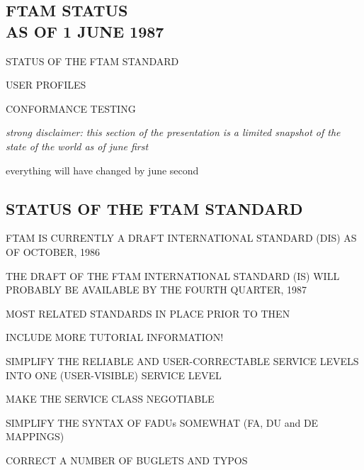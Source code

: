 
\begin{bwslide}
\part	{FTAM STATUS\\ AS OF 1 JUNE 1987}

\begin{nrtc}\bf
\item	STATUS OF THE FTAM STANDARD

\item	USER PROFILES

\item	CONFORMANCE TESTING
\end{nrtc}
\end{bwslide}


\begin{note}\em
strong disclaimer: this section of the presentation is a limited snapshot of
the state of the world as of june first

everything will have changed by june second
\end{note}


\begin{bwslide}
\part*	{STATUS OF THE FTAM STANDARD}\bf

\begin{nrtc}
\item	FTAM IS CURRENTLY A DRAFT INTERNATIONAL STANDARD (DIS)
	AS OF OCTOBER, 1986

\item	THE DRAFT OF THE FTAM INTERNATIONAL STANDARD (IS) WILL PROBABLY
	BE AVAILABLE BY THE FOURTH QUARTER, 1987

\item	MOST RELATED STANDARDS IN PLACE PRIOR TO THEN
\end{nrtc}
\end{bwslide}


\begin{bwslide}

\begin{nrtc}
\item	INCLUDE MORE TUTORIAL INFORMATION!

\item	SIMPLIFY THE RELIABLE AND USER-CORRECTABLE SERVICE LEVELS INTO ONE
	(USER-VISIBLE) SERVICE LEVEL

\item	MAKE THE SERVICE CLASS NEGOTIABLE

\item	SIMPLIFY THE SYNTAX OF FADUs SOMEWHAT (FA, DU and DE MAPPINGS)

\item	CORRECT A NUMBER OF BUGLETS AND TYPOS
\end{nrtc}
\end{bwslide}


